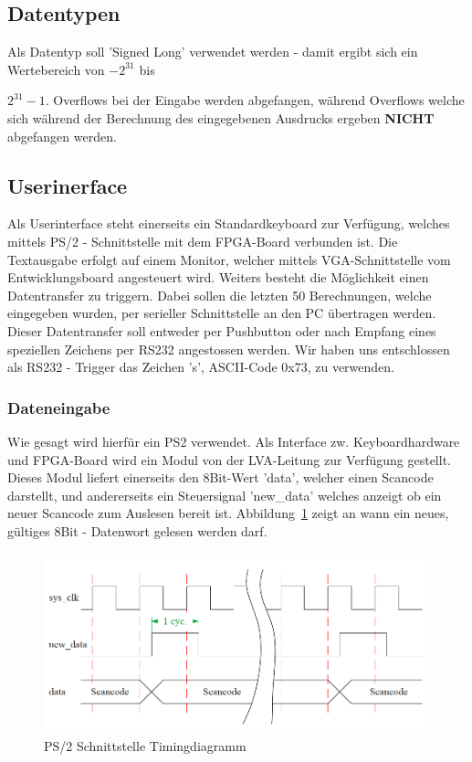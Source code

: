 \subsection{Datentypen}

Als Datentyp soll 'Signed Long' verwendet werden - damit ergibt sich ein Wertebereich von $-2^{31}$ bis \begin{tiny}\end{tiny}$2^{31} - 1$. Overflows bei der Eingabe werden abgefangen, während Overflows welche sich während der Berechnung des eingegebenen Ausdrucks ergeben \textbf{NICHT} abgefangen werden.

\subsection{Userinerface}

Als Userinterface steht einerseits ein Standardkeyboard zur Verfügung, welches mittels PS/2 - Schnittstelle mit dem FPGA-Board verbunden ist. Die Textausgabe erfolgt auf einem Monitor, welcher mittels VGA-Schnittstelle vom Entwicklungsboard angesteuert wird. 
Weiters besteht die Möglichkeit einen Datentransfer zu triggern. Dabei sollen die letzten 50 Berechnungen, welche eingegeben wurden, per serieller Schnittstelle an den PC übertragen werden. Dieser Datentransfer soll entweder per Pushbutton oder nach Empfang eines speziellen Zeichens per RS232 angestossen werden. Wir haben uns entschlossen als RS232 - Trigger das Zeichen 's', ASCII-Code 0x73, zu verwenden.

\subsubsection{Dateneingabe}

Wie gesagt wird hierfür ein PS\/2 verwendet. Als Interface zw. Keyboardhardware und FPGA-Board wird ein Modul von der LVA-Leitung zur Verfügung gestellt. Dieses Modul liefert einerseits den 8Bit-Wert 'data', welcher einen Scancode darstellt, und andererseits ein Steuersignal 'new\_data' welches anzeigt ob ein neuer Scancode zum  Auslesen bereit ist. Abbildung~\ref{fig:ps2timing} zeigt an wann ein neues, gültiges 8Bit - Datenwort gelesen werden darf.

\begin{figure}[!ht]
	\centering
	\includegraphics[scale=0.40]{figures/ps2_timing.png} 
	\caption{PS/2 Schnittstelle Timingdiagramm}
	\label{fig:ps2timing}
\end{figure}

